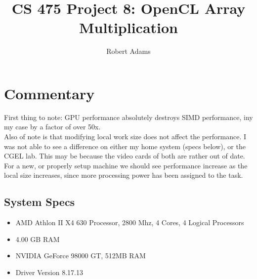 \documentclass[letterpaper,10pt]{article} %
\begin{document}
\title{CS 475 Project 8: OpenCL Array Multiplication} 
\author{Robert Adams}
\maketitle



\section{Commentary}

\indent First thing to note: GPU performance absolutely destroys SIMD performance,
iny my case by a factor of over 50x. 
\\
Also of note is that modifying local work size does not affect the 
performance. I was not able to see a difference on either my home 
system (specs below), or the CGEL lab. This may be because the video
cards of both are rather out of date.  For a new, or properly setup
machine we should see performance increase as the local size increases,
since more processing power has been assigned to the task.

\subsection{System Specs}

\begin{itemize}
\item AMD Athlon II X4 630 Processor, 2800 Mhz, 4 Cores, 4 Logical Processors
\item 4.00 GB RAM
\item  NVIDIA GeForce 98000 GT, 512MB RAM
\item  Driver Version 8.17.13
\end{itemize}


\pagebreak

\begin{figure} [ht]
	\centering
	
	\label{runtimes}
\end{figure}

\begin{figure} [ht]
	\centering
	
	\label{runtimes}
\end{figure}



	
\end{document}
